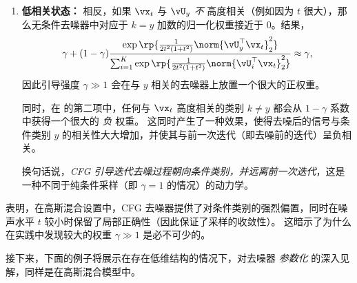 \documentclass[../../book-main_zh.tex]{subfiles}
\begin{document}
\begin{example}
\begin{enumerate}
            这意味着：\textit{如果 CFG 去噪器的输入与其中一个类别子空间高度相关，则该去噪器近似等于相应的类别条件去噪器}！因此，我们期望 CFG 去噪采样器能够收敛。
        \item \textbf{低相关状态：} 相反，如果 $\vx_t$ 与 $\vU_y$ \textit{不} 高度相关（例如因为 $t$ 很大），那么无条件去噪器中对应于 $k=y$ 加数的归一化权重接近于 $0$。结果，
            \begin{equation}
                \gamma + (1 - \gamma)
                \frac{\exp\rp{\frac{1}{2t^{2}(1
                + t^{2})}\norm{\vU_{y}^{\top}\vx_t}_{2}^{2}}}{\sum_{i
                    = 1}^{K}\exp\rp{\frac{1}{2t^{2}(1
                + t^{2})}\norm{\vU_{i}^{\top}\vx_t}_{2}^{2}}}
                \approx \gamma,
            \end{equation}
            因此引导强度 $\gamma \gg 1$ 会在与 $y$ 相关的去噪器上放置一个很大的正权重。

            同时，在  的第二项中，任何与 $\vx_t$ 高度相关的类别 $k \neq y$ 都会从 $1 - \gamma$ 系数中获得一个很大的 \textit{负} 权重。
            这同时产生了一种效果，使得去噪后的信号与条件类别 $y$ 的相关性大大增加，并使其与前一次迭代（即去噪前的迭代）呈负相关。

            换句话说，\textit{CFG 引导迭代去噪过程朝向条件类别，并远离前一次迭代}，这是一种不同于纯条件采样（即 $\gamma = 1$ 的情况）的动力学。
    \end{enumerate}
\end{example}

 表明，在高斯混合设置中，CFG 去噪器提供了对条件类别的强烈偏置，同时在噪声水平 $t$ 较小时保留了局部正确性（因此保证了采样的收敛性）。
这暗示了为什么在实践中发现较大的权重 $\gamma \gg 1$ 是必不可少的。

接下来，下面的例子将展示在存在低维结构的情况下，对去噪器 \textit{参数化} 的深入见解，同样是在高斯混合模型中。
\end{document}
